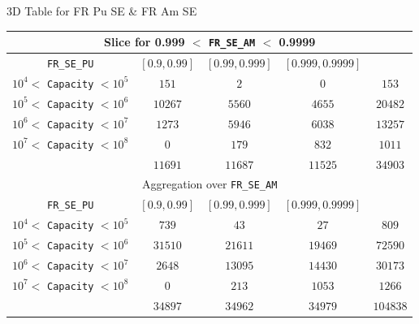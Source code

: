 \documentclass[pdf, autumn, slideColor, nocolorBG]{prosper}
\begin{document}
\begin{slide}{3D Table for FR Pu SE \& FR Am SE}
\begin{center}
\tiny
\begin{tabular}{|c||c|c|c||c|}
\hline
\multicolumn{5}{|c|}{Slice for 0.999 $<$ \texttt{FR\_SE\_AM} $<$ 0.9999}\\
\hline
\texttt{FR\_SE\_PU} & $[0.9, 0.99]$ & $[0.99, 0.999]$& $[0.999, 0.9999]$&\\
\hline
$10^4 <$ \texttt{Capacity} $< 10^5$&$151$&$2$&$0$&$153$\\
\hline
$10^5 <$ \texttt{Capacity} $< 10^6$&$10267$&$5560$&$4655$&$20482$\\
\hline
$10^6 <$ \texttt{Capacity} $< 10^7$&$1273$&$5946$&$6038$&$13257$\\
\hline
$10^7 <$ \texttt{Capacity} $< 10^8$&$0$&$179$&$832$&$1011$\\
\hline
&$11691$&$11687$&$11525$&$34903$\\
\hline
\hline
\multicolumn{5}{|c|}{Aggregation over \texttt{FR\_SE\_AM}}\\
\hline
\texttt{FR\_SE\_PU} & $[0.9, 0.99]$ & $[0.99, 0.999]$& $[0.999, 0.9999]$&\\
\hline
$10^4 <$ \texttt{Capacity} $< 10^5$&$739$&$43$&$27$&$809$\\
\hline
$10^5 <$ \texttt{Capacity} $< 10^6$&$31510$&$21611$&$19469$&$72590$\\
\hline
$10^6 <$ \texttt{Capacity} $< 10^7$&$2648$&$13095$&$14430$&$30173$\\
\hline
$10^7 <$ \texttt{Capacity} $< 10^8$&$0$&$213$&$1053$&$1266$\\
\hline
&$34897$&$34962$&$34979$&$104838$\\
\hline
\end{tabular}
\end{center}
\end{slide}





\end{document}
